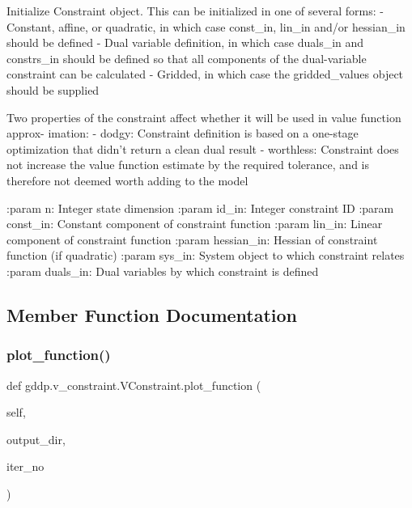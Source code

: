 \begin{DoxyVerb}Initialize Constraint object. This can be initialized in one of several forms:
- Constant, affine, or quadratic, in which case const_in, lin_in and/or hessian_in should
    be defined
- Dual variable definition, in which case duals_in and constrs_in should be defined so that
    all components of the dual-variable constraint can be calculated
- Gridded, in which case the gridded_values object should be supplied

Two properties of the constraint affect whether it will be used in value function approx-
imation:
- dodgy: Constraint definition is based on a one-stage optimization that didn't return a
clean dual result
- worthless: Constraint does not increase the value function estimate by the required
tolerance, and is therefore not deemed worth adding to the model

:param n: Integer state dimension
:param id_in: Integer constraint ID
:param const_in: Constant component of constraint function
:param lin_in: Linear component of constraint function
:param hessian_in: Hessian of constraint function (if quadratic)
:param sys_in: System object to which constraint relates
:param duals_in: Dual variables by which constraint is defined
\end{DoxyVerb}
 

\subsection{Member Function Documentation}
\mbox{\label{classgddp_1_1v__constraint_1_1_v_constraint_a69113e1dad8edbb6e7b0c34923014a20}} 
\subsubsection{\texorpdfstring{plot\_function()}{plot\_function()}}
{\footnotesize\ttfamily def gddp.\+v\+\_\+constraint.\+V\+Constraint.\+plot\+\_\+function (\begin{DoxyParamCaption}\item[{}]{self,  }\item[{}]{output\+\_\+dir,  }\item[{}]{iter\+\_\+no }\end{DoxyParamCaption})}

